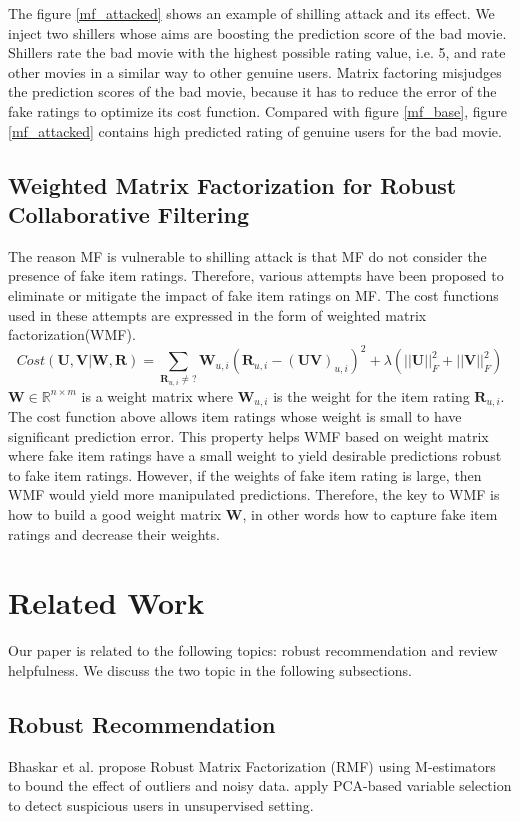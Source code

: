 \documentclass[master,english,final]{kaist-ucs}
\begin{document}
The figure \ref{mf_attacked} shows an example of shilling attack and its effect. We inject two shillers whose aims are boosting the prediction score of the bad movie.
Shillers rate the bad movie with the highest possible rating value, i.e. 5, and rate other movies in a similar way to other genuine users.
Matrix factoring misjudges the prediction scores of the bad movie, because it has to reduce the error of the fake ratings to optimize its cost function.
Compared with figure \ref{mf_base}, figure \ref{mf_attacked} contains high predicted rating of genuine users for the bad movie.


\section{Weighted Matrix Factorization for Robust Collaborative Filtering}
The reason MF is vulnerable to shilling attack is that MF do not consider the presence of fake item ratings.
Therefore, various attempts have been proposed to eliminate or mitigate the impact of fake item ratings on MF.
The cost functions used in these attempts are expressed in the form of weighted matrix factorization(WMF).
\begin{equation}
Cost(\bm{U},\bm{V} | \bm{W}, \bm{R})=\sum_{\bm{R}_{u,i} \neq ?} \bm{W}_{u,i}(  \bm{R}_{u,i} - (\bm{UV})_{u,i} )^2 + \lambda(||\bm{U}||_F^2+||\bm{V}||_F^2)
\end{equation}
$\bm{W} \in \mathbb{R}^{n \times m}$ is a weight matrix where $\bm{W}_{u,i}$ is the weight for the item rating $\bm{R}_{u,i}$.
The cost function above allows item ratings whose weight is small to have significant prediction error.
This property helps WMF based on weight matrix where fake item ratings have a small weight to yield desirable predictions robust to fake item ratings.
However, if the weights of fake item rating is large, then WMF would yield more manipulated predictions.
Therefore, the key to WMF is how to build a good weight matrix $\bm{W}$, in other words how to capture fake item ratings and decrease their weights.

\chapter{Related Work}
Our paper is related to the following topics: robust recommendation and review helpfulness. We discuss the two topic in the following subsections.

\section{Robust Recommendation}
Bhaskar et al. \cite{RMF} propose Robust Matrix Factorization (RMF) using M-estimators to bound the effect of outliers and noisy data. \cite{LiesAndPropaganda,UnsupervisedShilling,AttackResistant} apply PCA-based variable selection to detect suspicious users in unsupervised setting.
\end{document}
